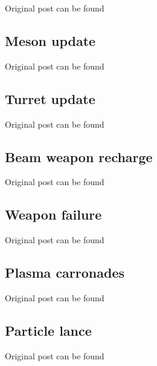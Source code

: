 \documentclass[../Aurora C# unofficial manual.tex]{subfiles}
\begin{document}
	Original post can be found
	
	\subsection{Meson update}
	Original post can be found
	
	\subsection{Turret update}
	Original post can be found
	
	\subsection{Beam weapon recharge}
	Original post can be found
	
	\subsection{Weapon failure}
	Original post can be found
	
	\subsection{Plasma carronades}
	Original post can be found
	
	\subsection{Particle lance}
	Original post can be found
	
\end{document}
